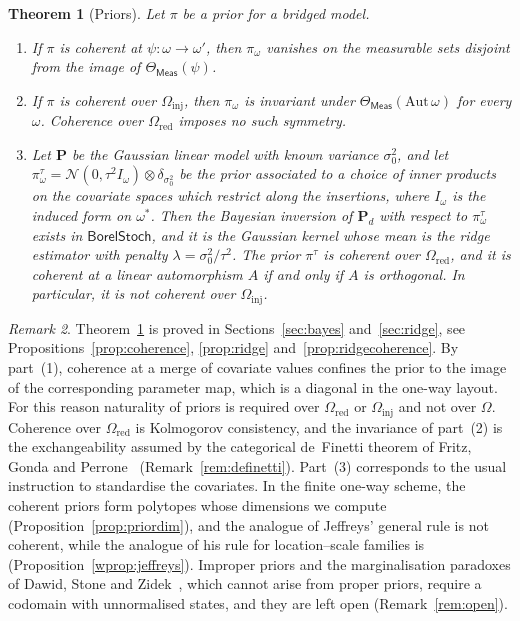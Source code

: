 \documentclass[11pt,a4paper]{article}
\theoremstyle{plain}
\newtheorem{theorem}{Theorem}[section]
\theoremstyle{definition}
\theoremstyle{remark}
\newtheorem{remark}[theorem]{Remark}
\newcommand{\cat}[1]{\mathsf{#1}}
\newcommand{\catO}{\cat{\Omega}}
\newcommand{\Meas}{\cat{Meas}}
\newcommand{\Norm}{\mathcal{N}}
\newcommand{\BorelStoch}{\cat{BorelStoch}}
\begin{document}
\begin{theorem}[Priors]\label{thm:main-priors}
Let $\pi$ be a prior for a bridged model.
\begin{enumerate}
\item If $\pi$ is coherent at $\psi \colon \omega \to \omega'$, then
$\pi_{\omega}$ vanishes on the measurable sets disjoint from the image of
$\Theta_\Meas(\psi)$.
\item If $\pi$ is coherent over $\catO_{\mathrm{inj}}$, then $\pi_{\omega}$ is
invariant under $\Theta_\Meas(\mathrm{Aut}\,\omega)$ for every $\omega$.
Coherence over $\catO_{\mathrm{red}}$ imposes no such symmetry.
\item Let $\mathbf{P}$ be the Gaussian linear model with known variance
$\sigma_{0}^{2}$, and let
$\pi^{\tau}_{\omega} = \Norm(0,\tau^{2}I_{\omega}) \otimes
\delta_{\sigma_{0}^{2}}$ be the prior associated to a choice of inner products
on the covariate spaces which restrict along the insertions, where
$I_{\omega}$ is the induced form on $\omega^{*}$. Then the Bayesian
inversion of $\mathbf{P}_{d}$ with respect to $\pi^{\tau}_{\omega}$ exists in
$\BorelStoch$, and it is the Gaussian kernel whose mean is the ridge estimator
with penalty $\lambda = \sigma_{0}^{2}/\tau^{2}$. The prior $\pi^{\tau}$ is
coherent over $\catO_{\mathrm{red}}$, and it is coherent at a linear
automorphism $A$ if and only if $A$ is orthogonal. In particular, it is not
coherent over $\catO_{\mathrm{inj}}$.
\end{enumerate}
\end{theorem}

\begin{remark}\label{rem:main-priors}
Theorem~\ref{thm:main-priors} is proved in Sections~\ref{sec:bayes}
and~\ref{sec:ridge}, see Propositions~\ref{prop:coherence}, \ref{prop:ridge}
and~\ref{prop:ridgecoherence}. By part~(1), coherence at a merge of covariate
values confines the prior to the image of the corresponding parameter map,
which is a diagonal in the one-way layout. For this reason naturality of
priors is required over $\catO_{\mathrm{red}}$ or $\catO_{\mathrm{inj}}$ and
not over $\catO$. Coherence over $\catO_{\mathrm{red}}$ is Kolmogorov consistency, and
the invariance of part~(2) is the exchangeability assumed by the categorical
de~Finetti theorem of Fritz, Gonda and
Perrone~\cite{fritz_definetti_2021} (Remark~\ref{rem:definetti}). Part~(3)
corresponds to the usual instruction to standardise the covariates. In the
finite one-way scheme, the coherent priors form polytopes whose dimensions we
compute (Proposition~\ref{prop:priordim}), and the analogue of Jeffreys'
general rule is not coherent, while the analogue of his rule for
location--scale families is (Proposition~\ref{wprop:jeffreys}). Improper
priors and the marginalisation paradoxes of Dawid, Stone and
Zidek~\cite{dawid_stone_zidek_1973}, which cannot arise from proper priors,
require a codomain with unnormalised states, and they are left open
(Remark~\ref{rem:open}).
\end{remark}
\end{document}
